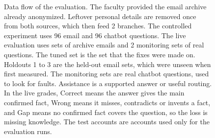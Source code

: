 \begin{figure}[htbp]
\caption[Data flow of the evaluation]{Data flow of the evaluation. The faculty provided the email archive already anonymized. Leftover personal details are removed once from both sources, which then feed 2 branches. The controlled experiment uses 96 email and 96 chatbot questions. The live evaluation uses sets of archive emails and 2 monitoring sets of real questions. The tuned set is the set that the fixes were made on. Holdouts 1 to 3 are the held-out email sets, which were unseen when first measured. The monitoring sets are real chatbot questions, used to look for faults. Assistance is a supported answer or useful routing. In the live grades, Correct means the answer gives the main confirmed fact, Wrong means it misses, contradicts or invents a fact, and Gap means no confirmed fact covers the question, so the loss is missing knowledge. The test accounts are accounts used only for the evaluation runs.}
\label{fig:eval-dataflow}
\end{figure}

